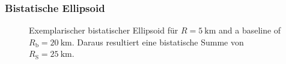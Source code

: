 \begin{frame}
    \frametitle{Bistatische Ellipsoid}

    \begin{figure}
        \centering
        \begin{adjustbox}{max width=\textwidth,totalheight=\baselineskip}
            \begin{tikzpicture}
                
            \end{tikzpicture}
        \end{adjustbox}
        \caption{Exemplarischer bistatischer Ellipsoid für \(R = \SI{5}{\kilo\metre}\) and a baseline of \(R_{\text{b}} = \SI{20}{\kilo\metre}\). Daraus resultiert eine bistatische Summe von \(R_{\text{S}} = \SI{25}{\kilo\metre}\).}
    \end{figure}
\end{frame}
